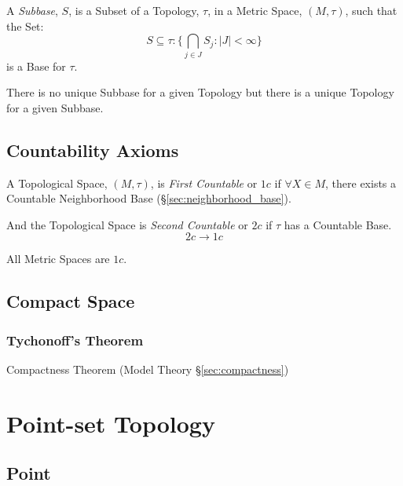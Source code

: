 A \emph{Subbase}, $S$, is a Subset of a Topology, $\tau$, in a Metric
Space, $(M,\tau)$, such that the Set:
\[
    S \subseteq \tau : \{ \bigcap_{j \in J} S_j : |J| < \infty \}
\]
is a Base for $\tau$.

There is no unique Subbase for a given Topology but there is a unique
Topology for a given Subbase.



\subsection{Countability Axioms}\label{sec:countability_axioms}

A Topological Space, $(M,\tau)$, is \emph{First Countable} or $1c$ if
$\forall X \in M$, there exists a Countable Neighborhood Base
(\S\ref{sec:neighborhood_base}).

And the Topological Space is \emph{Second Countable} or $2c$ if $\tau$
has a Countable Base.
\[
    2c \rightarrow 1c
\]

All Metric Spaces are $1c$.



\subsection{Compact Space}\label{sec:compact_space}

\subsubsection{Tychonoff's Theorem}\label{sec:tychonoffs_theorem}

Compactness Theorem (Model Theory \S\ref{sec:compactness})



\section{Point-set Topology}\label{sec:point_set}

\subsection{Point}\label{sec:topological_point}

